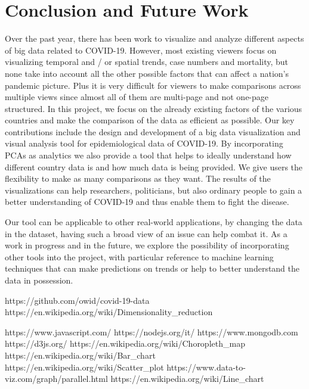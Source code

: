 \documentclass[10pt,conference]{IEEEtran}
\begin{document}
\section{Conclusion and Future Work}
Over the past year, there has been work to visualize and analyze different aspects of big data related to COVID-19. However, most existing viewers focus on visualizing temporal and / or spatial trends, case numbers and mortality, but none take into account all the other possible factors that can affect a nation's pandemic picture. Plus it is very difficult for viewers to make comparisons across multiple views since almost all of them are multi-page and not one-page structured. In this project, we focus on the already existing factors of the various countries and make the comparison of the data as efficient as possible. Our key contributions include the design and development of a big data visualization and visual analysis tool for epidemiological data of COVID-19. By incorporating PCAs as analytics we also provide a tool that helps to ideally understand how different country data is and how much data is being provided. We give users the flexibility to make as many comparisons as they want. The results of the visualizations can help researchers, politicians, but also ordinary people to gain a better understanding of COVID-19 and thus enable them to fight the disease.

Our tool can be applicable to other real-world applications, by changing the data in the dataset, having such a broad view of an issue can help combat it. As a work in progress and in the future, we explore the possibility of incorporating other tools into the project, with particular reference to machine learning techniques that can make predictions on trends or help to better understand the data in possession.


\begin{thebibliography}{00}

 https://github.com/owid/covid-19-data
 https://en.wikipedia.org/wiki/Dimensionality\_reduction

 https://www.javascript.com/
 https://nodejs.org/it/
 https://www.mongodb.com
 https://d3js.org/
 https://en.wikipedia.org/wiki/Choropleth\_map
 https://en.wikipedia.org/wiki/Bar\_chart
 https://en.wikipedia.org/wiki/Scatter\_plot
 https://www.data-to-viz.com/graph/parallel.html
 https://en.wikipedia.org/wiki/Line\_chart

\end{thebibliography}
\end{document}
